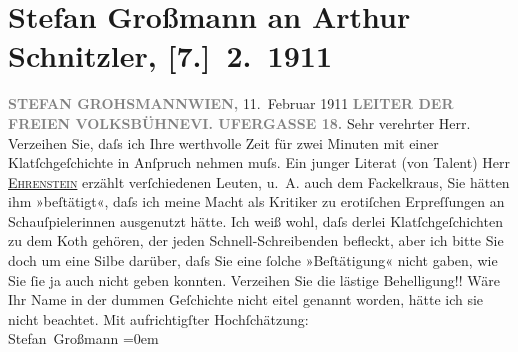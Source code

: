 

         
         \renewcommand{\erwaehntePersonen}{Personen: Albert Ehrenstein, Stefan Großmann, Karl Kraus}
         \renewcommand{\erwaehnteInstitutionen}{Institutionen: Die Fackel, Wiener Freie Volksbühne}
         \renewcommand{\erwaehnteOrte}{Orte: Linke Wienzeile, Wien}
         \renewcommand{\erwaehnteWerke}{}
               \section[Stefan Großmann an Arthur Schnitzler, {[}7.{]} 2. 1911]{ Stefan Großmann an Arthur Schnitzler, {[}7.{]} 2. 1911}\nopagebreak{}\rehead{ }\begin{ledgroupsized}[t]{13cm}\normalsize\beginnumbering \toendnotes[C]{\smallbreak\pagebreak[2]} 
\pstart
           {\pb}\textcolor{gray}{\textbf{STEFAN GROHSMANN}}\hfill \textcolor{gray}{\textbf{WIEN,}}{ }11. Februar 1911\pend
           \pstart
           \textcolor{gray}{\textbf{LEITER DER FREIEN
                           VOLKSBÜHNE}}\hfill \textcolor{gray}{\textbf{VI. UFERGASSE 18.}}\pend
           \pstart\center{}Sehr verehrter Herr.\pend\pstart
           Verzeihen Sie, daſs ich Ihre werthvolle Zeit für zwei Minuten mit einer
               Klatſchgeſchichte  in Anſpruch nehmen muſs.\pend
           \pstart
           Ein junger Literat (von Talent) Herr \uline{\textsc{Ehrenstein}} erzählt verſchiedenen Leuten, u. A. auch dem Fackelkraus, Sie hätten ihm »beſtätigt«,
               daſs ich meine Macht als Kritiker zu erotiſchen Erpreſſungen an Schauſpielerinnen
               ausgenutzt hätte.\pend
           \pstart
           Ich weiß wohl, daſs derlei Klatſchgeſchichten zu dem Koth gehören, der jeden
               Schnell-Schreibenden befleckt, aber ich bitte Sie doch um eine Silbe darüber, daſs
               Sie eine ſolche »Beſtätigung« nicht gaben, wie Sie ſie ja auch nicht geben
               konnten.\pend
           \pstart
           Verzeihen Sie die lästige Behelligung!! Wäre Ihr Name in der dummen Geſchichte nicht
               eitel genannt worden, hätte ich sie nicht beachtet.\pend
           \pstart
           Mit aufrichtigſter Hochſchätzung:{\\[\baselineskip]}\spacefill\mbox{Stefan Großmann}\pend
           \leftskip=0em{}
         

\end{ledgroupsized}
